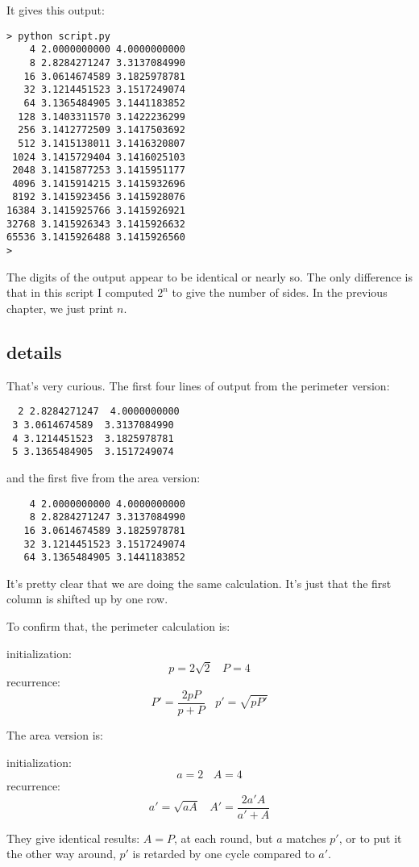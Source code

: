 \documentclass[11pt, oneside]{article}
\begin{document}
It gives this output:

\begin{verbatim}
> python script.py 
    4 2.0000000000 4.0000000000
    8 2.8284271247 3.3137084990
   16 3.0614674589 3.1825978781
   32 3.1214451523 3.1517249074
   64 3.1365484905 3.1441183852
  128 3.1403311570 3.1422236299
  256 3.1412772509 3.1417503692
  512 3.1415138011 3.1416320807
 1024 3.1415729404 3.1416025103
 2048 3.1415877253 3.1415951177
 4096 3.1415914215 3.1415932696
 8192 3.1415923456 3.1415928076
16384 3.1415925766 3.1415926921
32768 3.1415926343 3.1415926632
65536 3.1415926488 3.1415926560
>
\end{verbatim}

The digits of the output appear to be identical or nearly so.  The only difference is that in this script I computed $2^n$ to give the number of sides.  In the previous chapter, we just print $n$.

\subsection*{details}

That's very curious.  The first four lines of output from the perimeter version:

\begin{verbatim}
  2 2.8284271247  4.0000000000
 3 3.0614674589  3.3137084990
 4 3.1214451523  3.1825978781
 5 3.1365484905  3.1517249074
\end{verbatim}

and the first five from the area version:
\begin{verbatim}
    4 2.0000000000 4.0000000000
    8 2.8284271247 3.3137084990
   16 3.0614674589 3.1825978781
   32 3.1214451523 3.1517249074
   64 3.1365484905 3.1441183852
\end{verbatim}

It's pretty clear that we are doing the same calculation.  It's just that the first column is shifted up by one row.

To confirm that, the perimeter calculation is:

initialization:
\[ p = 2 \sqrt{2} \ \ \ \ P = 4 \]
recurrence:
\[ P' = \frac{2pP}{p + P} \ \ \ \ p' = \sqrt{pP'} \]

The area version is:

initialization:
\[ a = 2 \ \ \ \ A = 4 \]
recurrence:
\[ a' =  \sqrt{aA} \ \ \ \  A' = \frac{2a'A}{a' + A} \]

They give identical results:  $A = P$, at each round, but $a$ matches $p'$, or to put it the other way around, $p'$ is retarded by one cycle compared to $a'$.
\end{document}
